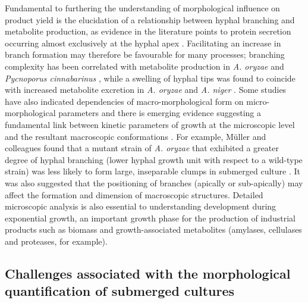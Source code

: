 Fundamental to furthering the understanding of morphological influence on product yield is the elucidation of a relationship between hyphal branching and metabolite production, as evidence in the literature points to protein secretion occurring almost exclusively at the hyphal apex \cite{wosten1991,muller2002}. Facilitating an increase in branch formation may therefore be favourable for many processes; branching complexity has been correlated with metabolite production in \emph{A. oryzae} \cite{spohr1997,tebiesebeke2005} and  \emph{Pycnoporus cinnabarinus} \cite{jones1997}, while a swelling of hyphal tips was found to coincide with increased metabolite excretion in \emph{A. oryzae} \cite{haack2006} and \emph{A. niger} \cite{papagianni2004}. Some studies have also indicated dependencies of macro-morphological form on micro-morphological parameters and there is emerging evidence suggesting a fundamental link between kinetic parameters of growth at the microscopic level and the resultant macroscopic conformations \cite{muller2002,muller2003,eypark2006}. For example, M\"{u}ller and colleagues found that a mutant strain of \emph{A. oryzae} that exhibited a greater degree of hyphal branching (lower hyphal growth unit with respect to a wild-type strain) was less likely to form large, inseparable clumps in submerged culture \cite{muller2002}. It was also suggested that the positioning of branches (apically or sub-apically) may affect the formation and dimension of macroscopic structures. Detailed microscopic analysis is also essential to understanding development during exponential growth, an important growth phase for the production of industrial products such as biomass and growth-associated metabolites (amylases, cellulases and proteases, for example).

\subsection{Challenges associated with the morphological quantification of submerged cultures}

